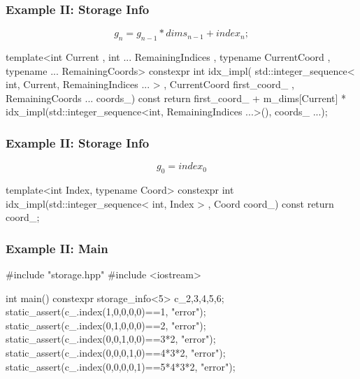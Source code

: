 \documentclass[aspectratio=43]{beamer}
\begin{document}
\begin{frame}[fragile]\frametitle{Example II: Storage Info}
  $$
      g_n = g_{n-1} * dims_{n-1} + index_{n};
  $$
  \begin{Cpplisting}{}
template<int Current
         , int ... RemainingIndices
         , typename CurrentCoord
         , typename ... RemainingCoords>
constexpr int idx_impl(
        std::integer_sequence< int,  Current, RemainingIndices ... >
        , CurrentCoord first_coord_
        , RemainingCoords ... coords_) const {
  return first_coord_
  + m_dims[Current]
  * idx_impl(std::integer_sequence<int, RemainingIndices ...>(), coords_ ...);
}
  \end{Cpplisting}
\end{frame}


\begin{frame}[fragile]\frametitle{Example II: Storage Info}
$$
  g_0 = index_0
$$
  \begin{Cpplisting}{}
template<int Index, typename Coord>
constexpr int idx_impl(std::integer_sequence< int, Index > , Coord coord_) const{
  return coord_;
}
  \end{Cpplisting}
\end{frame}


\begin{frame}[fragile]\frametitle{Example II: Main}
  \begin{Cpplisting}[: main ]{}
#include "storage.hpp"
#include <iostream>

int main(){
    constexpr storage_info<5> c_{2,3,4,5,6};
    static_assert(c_.index(1,0,0,0,0)==1, "error");
    static_assert(c_.index(0,1,0,0,0)==2, "error");
    static_assert(c_.index(0,0,1,0,0)==3*2, "error");
    static_assert(c_.index(0,0,0,1,0)==4*3*2, "error");
    static_assert(c_.index(0,0,0,0,1)==5*4*3*2, "error");
}
  \end{Cpplisting}
\end{frame}
\end{document}
